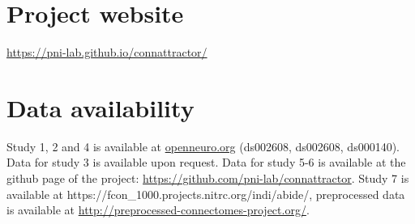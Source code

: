 \documentclass{article}
\begin{document}
\section{Project website}

\href{https://pni-lab.github.io/connattractor/}{https://pni-lab.github.io/connattractor/}

\section{Data availability}

Study 1, 2 and 4 is available at \href{http://openneuro.org}{openneuro.org} (ds002608, ds002608, ds000140). Data for study 3 is available upon request. Data for study 5-6 is available at the github page of the project: \href{https://github.com/pni-lab/connattractor}{https://github.com/pni-lab/connattractor}. Study 7 is available at https://fcon\_1000.projects.nitrc.org/indi/abide/, preprocessed data is available at \href{http://preprocessed-connectomes-project.org/}{http://preprocessed-connectomes-project.org/}.

\printglossaries






\end{document}
